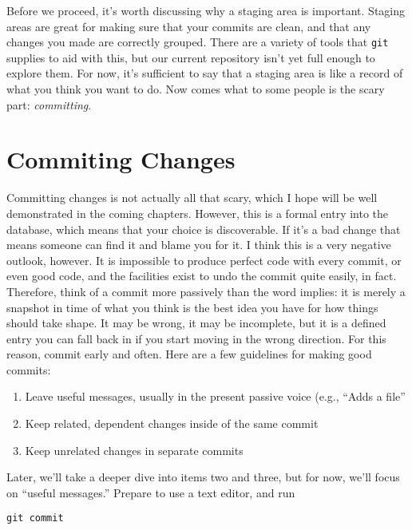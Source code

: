 \par{
Before we proceed, it's worth discussing why a staging area is important.
Staging areas are great for making sure that your commits are clean, and that
any changes you made are correctly grouped. There are a variety of tools that
\verb+git+ supplies to aid with this, but our current repository isn't yet
full enough to explore them. For now, it's sufficient to say that a staging
area is like a record of what you think you want to do. Now comes what to some
people is the scary part: \emph{committing}.
}

\section{Commiting Changes}

\par{
Committing changes is not actually all that scary, which I hope will be well
demonstrated in the coming chapters. However, this is a formal entry into the
database, which means that your choice is discoverable. If it's a bad change
that means someone can find it and blame you for it. I think this is a very
negative outlook, however. It is impossible to produce perfect code with every
commit, or even good code, and the facilities exist to undo the commit quite
easily, in fact. Therefore, think of a commit more passively than the word
implies: it is merely a snapshot in time of what you think is the best idea
you have for how things should take shape. It may be wrong, it may be
incomplete, but it is a defined entry you can fall back in if you start moving
in the wrong direction. For this reason, commit early and often. Here are a
few guidelines for making good commits:
}

\begin{enumerate}
\item Leave useful messages, usually in the present passive voice (e.g.,
``Adds a file''
\item Keep related, dependent changes inside of the same commit
\item Keep unrelated changes in separate commits
\end{enumerate}

\par{
Later, we'll take a deeper dive into items two and three, but for now, we'll
focus on ``useful messages.'' Prepare to use a text editor, and run
}

\begin{verbatim}
git commit
\end{verbatim}

